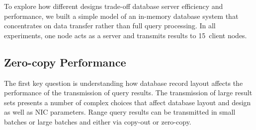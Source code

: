 To explore how different designs trade-off database server efficiency and
performance, we built a simple model of an in-memory database system that
concentrates on data transfer rather than full query processing.  In all experiments, one node acts
as a server and transmits results to 15~client nodes.


\subsection{Zero-copy Performance}
\label{sec:zero-copy-tput}

%

The first key question is understanding how database record layout affects the
performance of the transmission of query results.  The transmission of large
result sets presents a number of complex choices that affect
database layout and design as well as NIC parameters.  Range query
results can be transmitted in small batches or large batches and either via
copy-out or zero-copy.

